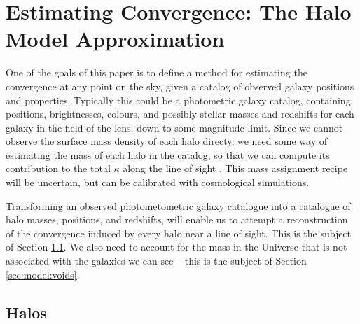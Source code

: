 \documentclass[useAMS,usenatbib]{mn2e}
\begin{document}



\section{Estimating Convergence: The Halo Model Approximation}
\label{sec:model}

One of the goals of this paper is to define a method for estimating the
convergence at any point on the sky, given a   catalog of observed
galaxy positions and properties. Typically this could be a  photometric
galaxy catalog, containing positions, brightnesses, colours, and
possibly stellar masses and redshifts for each galaxy in the field of
the lens, down to some magnitude limit. Since we cannot observe the
surface mass density of each halo directy, we need some way of
estimating the mass of each halo in the catalog, so that we can compute
its contribution to the total $\kappa$ along the line of sight \citep[as
in \eg][]{GunnarssonEtal2006,WongEtal2011}. This mass assignment recipe
will be uncertain, but can be calibrated with cosmological simulations.

Transforming an observed photometometric galaxy catalogue into a 
catalogue of halo masses, positions, and redshifts, will enable us to
attempt a reconstruction of the convergence induced by every halo near a
line of sight. This is the subject of Section \ref{sec:model:halos}. We
also need to account for the mass in the Universe that is not associated
with the galaxies we can see -- this is the subject of Section
\ref{sec:model:voids}. 



\subsection{Halos}
\label{sec:model:halos}
\end{document}
